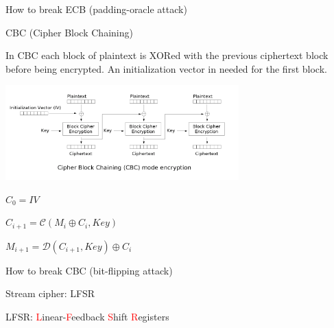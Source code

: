 \begin{frame}{How to break ECB (padding-oracle attack)}

\end{frame}

\begin{frame}{CBC (Cipher Block Chaining)}

In CBC each block of plaintext is XORed with the previous ciphertext block before being encrypted. An initialization vector in needed for the first block.
 
\medskip

\centerline{\includegraphics[width=9cm]{img/CBC.png}}

\medskip

$C_0 = IV$

$C_{i+1} = \mathcal{C}(M_i \oplus C_{i}, Key)$

$M_{i+1} = \mathcal{D}(C_{i+1}, Key) \oplus C_{i}$
\end{frame}

\begin{frame}{How to break CBC (bit-flipping attack)}

\end{frame}

\begin{frame}{Stream cipher: LFSR}

  LFSR: \textcolor{red}{L}inear-\textcolor{red}{F}eedback \textcolor{red}{S}hift \textcolor{red}{R}egisters
  
\end{frame}
